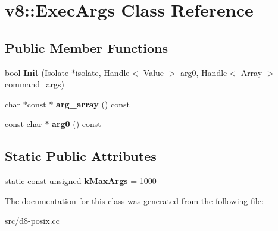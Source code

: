 \hypertarget{classv8_1_1_exec_args}{}\section{v8\+:\+:Exec\+Args Class Reference}
\label{classv8_1_1_exec_args}
\subsection*{Public Member Functions}
\begin{DoxyCompactItemize}
\item 
\hypertarget{classv8_1_1_exec_args_af64b8dad4900e0b8a187ab11fee2a242}{}bool {\bfseries Init} (Isolate $\ast$isolate, \hyperlink{classv8_1_1_handle}{Handle}$<$ Value $>$ arg0, \hyperlink{classv8_1_1_handle}{Handle}$<$ Array $>$ command\+\_\+args)\label{classv8_1_1_exec_args_af64b8dad4900e0b8a187ab11fee2a242}

\item 
\hypertarget{classv8_1_1_exec_args_ac1f9ee5843647f471b7c6c889b30c55c}{}char $\ast$const $\ast$ {\bfseries arg\+\_\+array} () const \label{classv8_1_1_exec_args_ac1f9ee5843647f471b7c6c889b30c55c}

\item 
\hypertarget{classv8_1_1_exec_args_ab9048917a6d14f4e9f7327f2a257d973}{}const char $\ast$ {\bfseries arg0} () const \label{classv8_1_1_exec_args_ab9048917a6d14f4e9f7327f2a257d973}

\end{DoxyCompactItemize}
\subsection*{Static Public Attributes}
\begin{DoxyCompactItemize}
\item 
\hypertarget{classv8_1_1_exec_args_acef444e061c4104eb8810fd0d5ae366d}{}static const unsigned {\bfseries k\+Max\+Args} = 1000\label{classv8_1_1_exec_args_acef444e061c4104eb8810fd0d5ae366d}

\end{DoxyCompactItemize}


The documentation for this class was generated from the following file\+:\begin{DoxyCompactItemize}
\item 
src/d8-\/posix.\+cc\end{DoxyCompactItemize}
